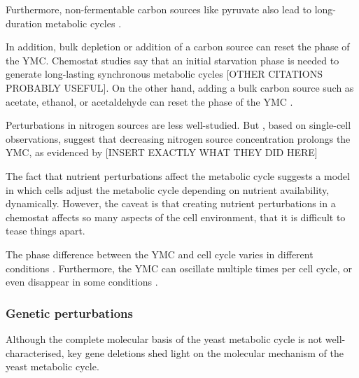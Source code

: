 Furthermore, non-fermentable carbon sources like pyruvate also lead to long-duration metabolic cycles \parencite{papagiannakisAutonomousMetabolicOscillations2017}.

In addition, bulk depletion or addition of a carbon source can reset the phase of the YMC.
Chemostat studies say that an initial starvation phase is needed to generate long-lasting synchronous metabolic cycles \parencite{tuLogicYeastMetabolic2005} [OTHER CITATIONS PROBABLY USEFUL].
On the other hand, adding a bulk carbon source such as acetate, ethanol, or acetaldehyde can reset the phase of the YMC \citep{kuangMsn2RegulateExpression2017, krishnaMinimalPushPull2018}.

Perturbations in nitrogen sources are less well-studied.
But \textcite{baumgartnerFlavinbasedMetabolicCycles2018}, based on single-cell observations, suggest that decreasing nitrogen source concentration prolongs the YMC, as evidenced by [INSERT EXACTLY WHAT THEY DID HERE]

The fact that nutrient perturbations affect the metabolic cycle suggests a model in which cells adjust the metabolic cycle depending on nutrient availability, dynamically. %
However, the caveat is that creating nutrient perturbations in a chemostat affects so many aspects of the cell environment, that it is difficult to tease things apart.

The phase difference between the YMC and cell cycle varies in different conditions %
\citep{ewaldYeastCyclinDependentKinase2016}. %
Furthermore, the YMC can oscillate multiple times per cell cycle, or even disappear in some conditions \citep{baumgartnerFlavinbasedMetabolicCycles2018}. %

\subsubsection{Genetic perturbations}
\label{subsubsec:intro-ymc-perturbations-genetic}
Although the complete molecular basis of the yeast metabolic cycle is not well-characterised, key gene deletions shed light on the molecular mechanism of the yeast metabolic cycle.

